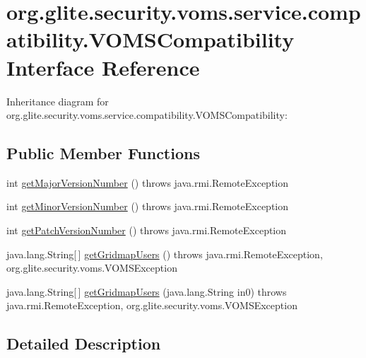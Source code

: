 \hypertarget{interfaceorg_1_1glite_1_1security_1_1voms_1_1service_1_1compatibility_1_1VOMSCompatibility}{
\section{org.glite.security.voms.service.compatibility.VOMSCompatibility Interface Reference}
\label{interfaceorg_1_1glite_1_1security_1_1voms_1_1service_1_1compatibility_1_1VOMSCompatibility}
}


Inheritance diagram for org.glite.security.voms.service.compatibility.VOMSCompatibility:
\subsection*{Public Member Functions}
\begin{DoxyCompactItemize}
\item 
int \hyperlink{interfaceorg_1_1glite_1_1security_1_1voms_1_1service_1_1compatibility_1_1VOMSCompatibility_ad866bec0d64199b35c2ecb629fe8134b}{getMajorVersionNumber} ()  throws java.rmi.RemoteException
\item 
int \hyperlink{interfaceorg_1_1glite_1_1security_1_1voms_1_1service_1_1compatibility_1_1VOMSCompatibility_a2759a869cf27dfdf9b475d95c3b001c8}{getMinorVersionNumber} ()  throws java.rmi.RemoteException
\item 
int \hyperlink{interfaceorg_1_1glite_1_1security_1_1voms_1_1service_1_1compatibility_1_1VOMSCompatibility_ae44bf014fa2a1f2a6b1aabb29e393a04}{getPatchVersionNumber} ()  throws java.rmi.RemoteException
\item 
java.lang.String\mbox{[}$\,$\mbox{]} \hyperlink{interfaceorg_1_1glite_1_1security_1_1voms_1_1service_1_1compatibility_1_1VOMSCompatibility_a5785760300214415198b4821a543a2a6}{getGridmapUsers} ()  throws java.rmi.RemoteException, org.glite.security.voms.VOMSException
\item 
java.lang.String\mbox{[}$\,$\mbox{]} \hyperlink{interfaceorg_1_1glite_1_1security_1_1voms_1_1service_1_1compatibility_1_1VOMSCompatibility_ade2796b915bb691c9a5e137e8a590b50}{getGridmapUsers} (java.lang.String in0)  throws java.rmi.RemoteException, org.glite.security.voms.VOMSException
\end{DoxyCompactItemize}


\subsection{Detailed Description}


